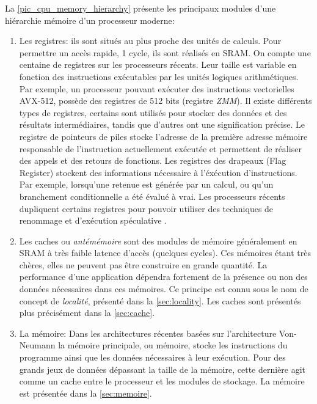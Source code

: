 La \autoref{pic_cpu_memory_hierarchy} présente les principaux modules d'une hiérarchie mémoire d'un processeur moderne:
\begin{enumerate}
    
    \item Les registres: ils sont situés au plus proche des unités de calculs. Pour permettre un accès rapide, 1 cycle, ils sont réalisés en SRAM. On compte une centaine de registres sur les processeurs récents. Leur taille est variable en fonction des instructions exécutables par les unités logiques arithmétiques. Par exemple, un processeur pouvant exécuter des instructions vectorielles AVX-512, possède des registres de 512 bits (registre \textit{ZMM}). Il existe différents types de registres, certains sont utilisés pour stocker des données et des résultats intermédiaires, tandis que d'autres ont une signification précise. Le registre de pointeurs de piles stocke l'adresse de la première adresse mémoire responsable de l'instruction actuellement exécutée et permettent de réaliser des appels et des retours de fonctions. Les registres des drapeaux (Flag Register) stockent des informations nécessaire à l'éxécution d'instructions. Par exemple, lorsqu'une retenue est générée par un calcul, ou qu'un branchement conditionnelle a été évalué à vrai. Les processeurs récents dupliquent certains registres pour pouvoir utiliser des techniques de renommage \cite{moudgill1993register} et d'exécution spéculative \cite{chou2004efficient}.

    \item Les caches ou \textit{antémémoire} sont des modules de mémoire généralement en SRAM à très faible latence d'accès (quelques cycles). Ces mémoires étant très chères, elles ne peuvent pas être construire en grande quantité. La performance d'une application dépendra fortement de la présence ou non des données nécessaires dans ces mémoires. Ce principe est connu sous le nom de concept de \textit{localité}, présenté dans la \autoref{sec:locality}. Les caches sont présentés plus précisément dans la \autoref{sec:cache}.
    
    \item La mémoire: Dans les architectures récentes basées sur l'architecture Von-Neumann la mémoire principale, ou mémoire, stocke les instructions du programme ainsi que les données nécessaires à leur exécution. Pour des grands jeux de données dépassant la taille de la mémoire, cette dernière agit comme un cache entre le processeur et les modules de stockage. La mémoire est présentée dans la \autoref{sec:memoire}.


\end{enumerate}
